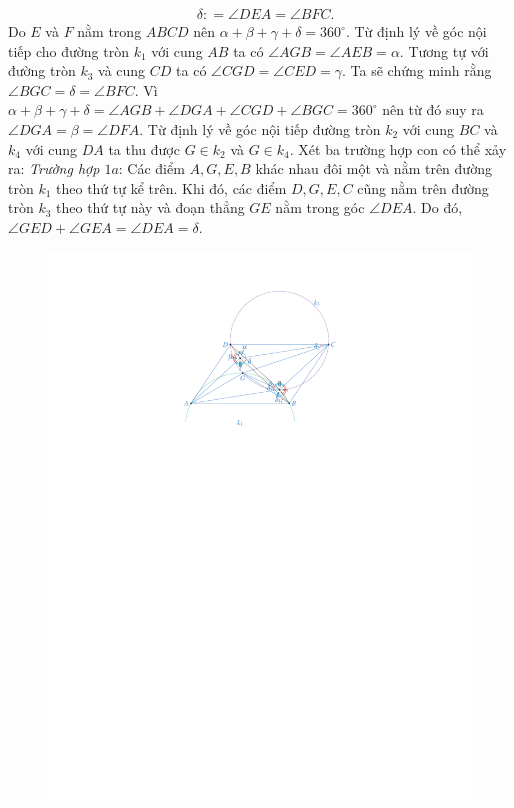 \begin{multicols}{2}
\begin{align*}
		&\delta \colon =  \angle DEA = \angle BFC.
	\end{align*}
	Do $E$ và $F$ nằm trong $ABCD$ nên $\alpha + \beta + \gamma + \delta = 360^{\circ}$.
	\vskip 0.1cm	
	Từ định lý về góc nội tiếp cho đường tròn $k_1$ với cung $AB$ ta có $\angle AGB = \angle AEB = \alpha$. Tương tự với đường tròn $k_3$ và cung $CD$ ta có $\angle CGD = \angle CED = \gamma$. Ta sẽ chứng minh rằng $\angle BGC = \delta = \angle BFC$. Vì $\alpha+ \beta + \gamma + \delta = \angle AGB + \angle DGA + \angle CGD + \angle BGC = 360^{\circ}$ nên từ đó suy ra $\angle DGA = \beta = \angle DFA$. Từ định lý về góc nội tiếp đường tròn $k_2$ với cung $BC$ và $k_4$ với cung $DA$ ta thu được $G \in k_2$ và $G \in k_4$. 
	\vskip 0.1cm	
	Xét ba trường hợp con có thể xảy ra:
	\vskip 0.1cm	
	\textit{Trường hợp $1a$}: Các điểm $A, G, E, B$ khác nhau đôi một và nằm trên đường tròn $k_1$ theo thứ tự kể trên. Khi đó, các điểm $D,G,E,C$ cũng nằm trên đường tròn $k_3$ theo thứ tự này và đoạn thẳng $GE$ nằm trong góc $\angle DEA$. Do đó, $\angle GED + \angle GEA = \angle DEA = \delta$.
	\begin{figure}[H]
		\vspace*{-5pt}
		\centering
		\captionsetup{labelformat= empty, justification=centering}
		\includegraphics[width=1\linewidth]{h1}

\end{figure}
\end{multicols}
